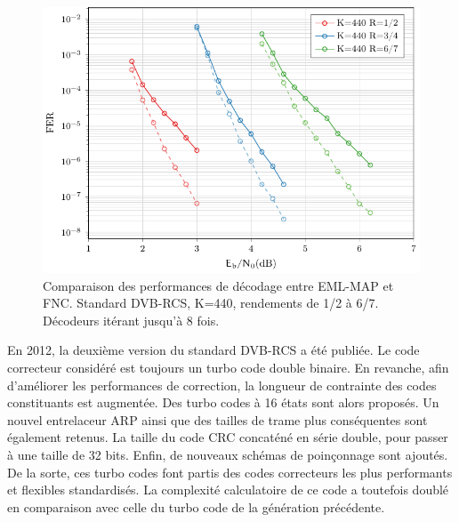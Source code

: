 \begin{figure}[!t]
	\centering
	\includegraphics[width=\textwidth]{main/ch3_fig/fnc/dvb/tikz/dvb1_440.pdf}
	\caption{Comparaison des performances de décodage entre EML-MAP et FNC. Standard DVB-RCS, K=440, rendements de 1/2 à 
	6/7. Décodeurs itérant jusqu'à 8 fois. \label{fig:fnc_dvb1_440}}
\end{figure}
En 2012, la deuxième version du standard DVB-RCS a été publiée. Le code correcteur considéré est toujours un turbo code double
binaire. En revanche, afin d'améliorer les performances de correction, la longueur de contrainte des codes constituants
est augmentée. Des turbo codes à 16 états sont alors proposés. Un nouvel entrelaceur ARP ainsi que des tailles de trame
plus conséquentes sont également retenus. La taille du code CRC concaténé en série double, pour passer à une taille de 32 bits. 
Enfin, de nouveaux schémas de poinçonnage sont ajoutés. De la sorte, ces turbo codes font 
partis des codes correcteurs les plus performants et flexibles standardisés. La complexité calculatoire de ce code a
toutefois doublé en comparaison avec celle du turbo code de la génération précédente. 

